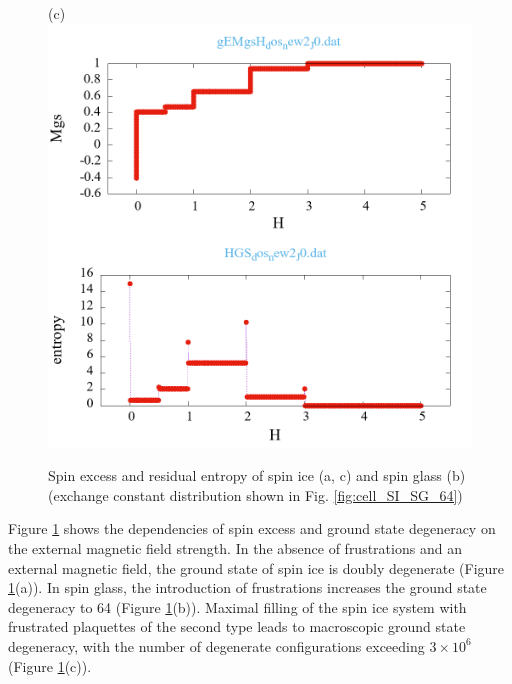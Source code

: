 \documentclass[utf8, babel, sor, jor, amsmath, amssymb, reprint]{elsarticle} %
\begin{document}
\begin{figure}[H]
\begin{minipage}[h]{0.32\linewidth}
	\end{minipage}
	\hfill
	\begin{minipage}[h]{0.32\linewidth}
		\centering(c)
		\includegraphics[width=1\linewidth]{pictures/_multiplot_SI64_J0}
	\end{minipage}
	
	\caption{Spin excess and residual entropy of spin ice (a, c) and spin glass (b) (exchange constant distribution shown in Fig. \ref{fig:cell_SI_SG_64})}
	\label{fig:_multiplot_SI_SG_64}
	
\end{figure}


Figure \ref{fig:_multiplot_SI_SG_64} shows the dependencies of spin excess and ground state degeneracy on the external magnetic field strength.
In the absence of frustrations and an external magnetic field, the ground state of spin ice is doubly degenerate (Figure \ref{fig:_multiplot_SI_SG_64}(a)).
In spin glass, the introduction of frustrations increases the ground state degeneracy to 64 (Figure \ref{fig:_multiplot_SI_SG_64}(b)).
Maximal filling of the spin ice system with frustrated plaquettes of the second type leads to macroscopic ground state degeneracy, with the number of degenerate configurations exceeding $3\times10^{6}$ (Figure \ref{fig:_multiplot_SI_SG_64}(c)).
\end{document}
